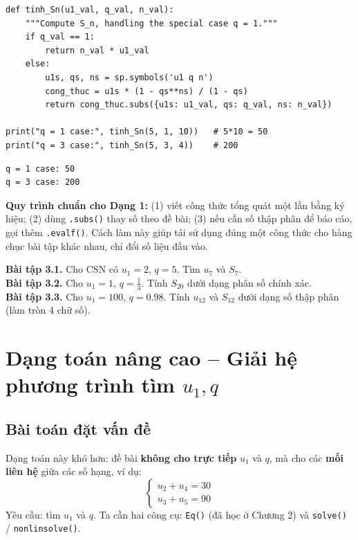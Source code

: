 \documentclass[12pt,a4paper]{report}
\begin{document}
\begin{lstlisting}[caption={Hàm tính Sn có xử lý riêng trường hợp q = 1}]
def tinh_Sn(u1_val, q_val, n_val):
    """Compute S_n, handling the special case q = 1."""
    if q_val == 1:
        return n_val * u1_val
    else:
        u1s, qs, ns = sp.symbols('u1 q n')
        cong_thuc = u1s * (1 - qs**ns) / (1 - qs)
        return cong_thuc.subs({u1s: u1_val, qs: q_val, ns: n_val})

print("q = 1 case:", tinh_Sn(5, 1, 10))   # 5*10 = 50
print("q = 3 case:", tinh_Sn(5, 3, 4))    # 200
\end{lstlisting}

\begin{lstlisting}[style=outstyle,caption={Kết quả}]
q = 1 case: 50
q = 3 case: 200
\end{lstlisting}

\begin{tipbox}
\textbf{Quy trình chuẩn cho Dạng 1:} (1) viết công thức tổng quát một
lần bằng ký hiệu; (2) dùng \texttt{.subs()} thay số theo đề bài; (3)
nếu cần số thập phân để báo cáo, gọi thêm \texttt{.evalf()}. Cách làm
này giúp tái sử dụng đúng một công thức cho hàng chục bài tập khác
nhau, chỉ đổi số liệu đầu vào.
\end{tipbox}

\begin{exbox}
\textbf{Bài tập 3.1.} Cho CSN có $u_1 = 2$, $q = 5$. Tìm $u_7$ và
$S_7$.\\[2pt]
\textbf{Bài tập 3.2.} Cho $u_1 = 1$, $q = \tfrac{1}{3}$. Tính $S_{20}$
dưới dạng phân số chính xác.\\[2pt]
\textbf{Bài tập 3.3.} Cho $u_1 = 100$, $q = 0.98$. Tính $u_{12}$ và
$S_{12}$ dưới dạng số thập phân (làm tròn 4 chữ số).
\end{exbox}

\newpage

\chapter{Dạng toán nâng cao -- Giải hệ phương trình tìm $u_1, q$}

\section{Bài toán đặt vấn đề}

Dạng toán này khó hơn: đề bài \textbf{không cho trực tiếp} $u_1$ và
$q$, mà cho các \textbf{mối liên hệ} giữa các số hạng, ví dụ:
\[
\begin{cases}
u_2 + u_4 = 30\\
u_3 + u_5 = 90
\end{cases}
\]
Yêu cầu: tìm $u_1$ và $q$. Ta cần hai công cụ: \texttt{Eq()} (đã học ở
Chương 2) và \texttt{solve()} / \texttt{nonlinsolve()}.
\end{document}
